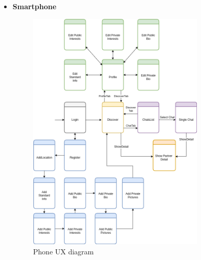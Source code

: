 \documentclass{article}
\begin{document}
\begin{itemize} 
	\item \bf Smartphone
		\begin{figure}[!htb]
			\centering
			\includegraphics[width=0.8\textwidth]{assets/images/UX.png}
			\caption{Phone UX diagram}
		\end{figure}


\end{itemize}
\end{document}
